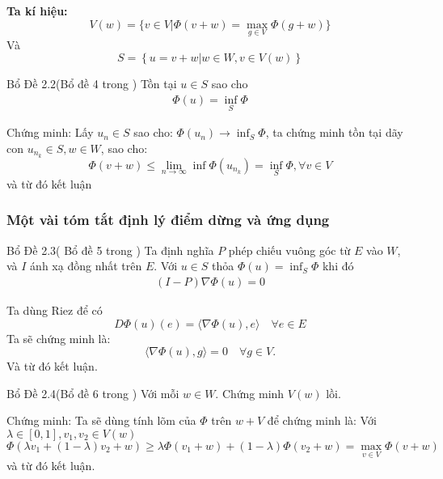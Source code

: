 \documentclass[11pt]{beamer}
\numberwithin{equation}{section}
\theoremstyle{plain}
\theoremstyle{definition}
\theoremstyle{remark}
\begin{document}
\begin{frame}
\textbf{Ta kí hiệu: }
$$ V(w)=\{ v \in V| \Phi( v+w ) =\max_{g\in V} \Phi( g+w ) \} $$ 
Và $$S=\left \{ u=v+w|w\in W ,v\in V(w)\right \}$$

\begin{block}{Bổ Đề 2.2(Bổ đề 4 trong \cite{YJMM})}
 Tồn tại  $u \in S$ sao cho 
 \begin{align}
 \Phi \left ( u \right )=\inf_{S}\Phi 
 \label{lem4}
 \end{align}
\end{block}
Chứng minh: Lấy $u_n\in S$ sao cho: $\Phi(u_n)\rightarrow \inf_S\Phi$, ta chứng minh tồn tại dãy con $u_{n_k}\in S,w\in W$, sao cho: $$\Phi \left ( v+w \right )\leq \lim_{n\rightarrow \infty }\inf\Phi \left (u_{n_k}  \right )=\inf_{S}\Phi,\forall v\in V$$
và từ đó kết luận
\end{frame}



\begin{frame}
\frametitle{Một vài tóm tắt định lý điểm dừng và ứng dụng }
\begin{block}{Bổ Đề 2.3( Bổ đề 5 trong \cite{YJMM})}
Ta định nghĩa $P$ phép chiếu vuông góc từ $E$ vào $W$, và $I$ ánh xạ đồng nhất trên $E$. Với $u \in S$ thỏa $\Phi(u) =\inf_S \Phi$ khi đó
\begin{align}
(I-P)\nabla \Phi (u) =0 
\label{Chieu}
\end{align}
\end{block}
Ta dùng Riez để có $$D\Phi(u)(e)= \langle \nabla \Phi(u) , e \rangle  \quad \forall e \in E $$
Ta sẽ chứng minh là:
\[\langle \nabla \Phi(u) , g \rangle =0 \quad \forall g \in V.\]
Và từ đó kết luận.
\end{frame}


\begin{frame}
\begin{block}{Bổ Đề 2.4(Bổ đề 6 trong \cite{YJMM})}
 Với mỗi $w \in W$. Chứng minh $V(w)$ lồi.
\end{block}
Chứng minh: Ta sẽ dùng tính lõm của $\Phi$ trên $w+V$ để chứng minh là: Với $\lambda \in [0,1], v_1,v_2\in V(w)$
\[\Phi(\lambda v_1 +(1-\lambda)v_2+w) \geq \lambda \Phi(v_1+w) + (1-\lambda )\Phi(v_2+w)=\max_{v \in V} \Phi(v+w)\]
và từ đó kết luận.
\end{frame}
\end{document}
